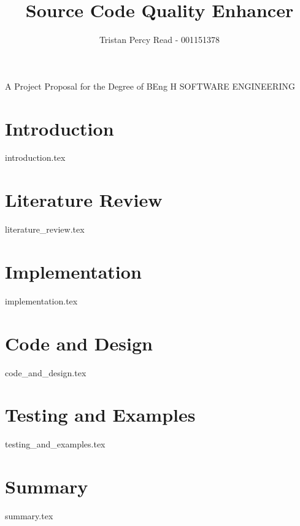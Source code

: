 \documentclass{COMPXXXX} %
\begin{document}

\title{Source Code Quality Enhancer} %
\author{Tristan Percy Read - 001151378} %

\maketitle %
{
	\centering
	A Project Proposal for the Degree of BEng H SOFTWARE ENGINEERING

} %

\section*{Introduction}
{introduction.tex}

\section*{Literature Review}
{literature_review.tex}

\section*{Implementation}
{implementation.tex}

\section*{Code and Design}
{code_and_design.tex}

\section*{Testing and Examples}
{testing_and_examples.tex}

\section*{Summary}
{summary.tex}


% 
\end{document}
